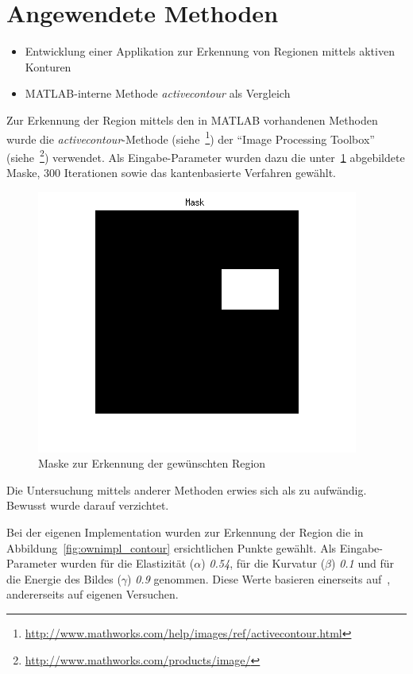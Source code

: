 \newpage

\section{Angewendete Methoden}
\label{sec:proceeding:methods}
\begin{itemize}
    \item Entwicklung einer Applikation zur Erkennung von Regionen mittels aktiven Konturen
    \item MATLAB-interne Methode \textit{activecontour} als Vergleich
\end{itemize}

Zur Erkennung der Region mittels den in MATLAB vorhandenen Methoden wurde die \textit{activecontour}-Methode (siehe~\footnote{\url{http://www.mathworks.com/help/images/ref/activecontour.html}}) der ``Image Processing Toolbox'' (siehe~\footnote{\url{http://www.mathworks.com/products/image/}}) verwendet. Als Eingabe-Parameter wurden dazu die unter~\ref{fig:matlab_mask} abgebildete Maske, 300 Iterationen sowie das kantenbasierte Verfahren gewählt.

\begin{figure}[h!]
    \centering
    \includegraphics[scale=0.5]{images/matlab_mask.png}
    \caption{Maske zur Erkennung der gewünschten Region\protect\footnotemark[6]{}}
\label{fig:matlab_mask}
\end{figure}

Die Untersuchung mittels anderer Methoden erwies sich als zu aufwändig. Bewusst wurde darauf verzichtet.

Bei der eigenen Implementation wurden zur Erkennung der Region die in Abbildung~\ref{fig:ownimpl_contour} ersichtlichen Punkte gewählt. Als Eingabe-Parameter wurden für die Elastizität ($\alpha$) \textit{0.54}, für die Kurvatur ($\beta$) \textit{0.1} und für die Energie des Bildes ($\gamma$) \textit{0.9} genommen. Diese Werte basieren einerseits auf~\cite[Seite 148]{hudritsch:script:cp}, andererseits auf eigenen Versuchen.

